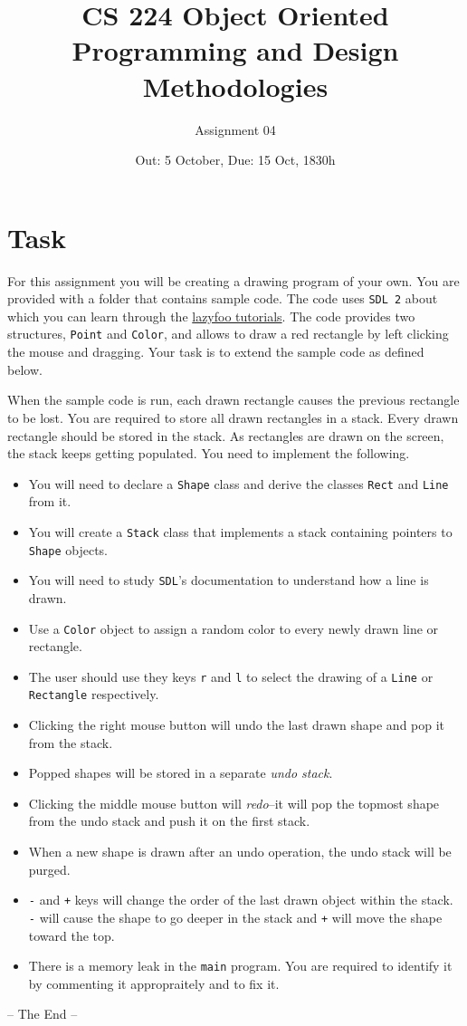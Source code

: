 \documentclass[a4paper,12pt]{article}
\title{CS 224 Object Oriented Programming and Design Methodologies}
\author{Assignment 04}
\date{Out: 5 October, Due: 15 Oct, 1830h}
\begin{document}
\maketitle

\section{Task}

For this assignment you will be creating a drawing program of your own. You are provided with a folder  that contains sample code. The code uses {\tt SDL 2} about which you can learn through the \href{\href{http://lazyfoo.net/tutorials/SDL/}}{lazyfoo tutorials}. The code provides two structures, {\tt Point} and {\tt Color}, and allows to draw a red rectangle by left clicking the mouse and dragging. Your task is to extend the sample code as defined below.

When the sample code is run, each drawn rectangle causes the previous rectangle to be lost. You are required to store all drawn rectangles in a stack. Every drawn rectangle should be stored in the stack. As rectangles are drawn on the screen, the stack keeps getting populated. You need to implement the following.

\begin{itemize}
\item You will need to declare a {\tt Shape} class and derive the classes {\tt Rect} and {\tt Line} from it.
\item You will create a {\tt Stack} class that implements a stack containing pointers to {\tt Shape} objects.
\item You will need to study {\tt SDL}'s documentation to understand how a line is drawn.
\item Use a {\tt Color} object to assign a random color to every newly drawn line or rectangle.
\item The user should use they keys {\tt r} and {\tt l} to select the drawing of a {\tt Line} or {\tt Rectangle} respectively.
\item Clicking the right mouse button will undo the last drawn shape and pop it from the stack.
\item Popped shapes will be stored in a separate {\it undo stack}.
\item Clicking the middle mouse button will {\it redo}--it will pop the topmost shape from the undo stack and push it on the first stack.
\item When a new shape is drawn after an undo operation, the undo stack will be purged.
\item {\tt -} and {\tt +} keys will change the order of the last drawn object within the stack. {\tt -} will cause the shape to go deeper in the stack and {\tt +} will move the shape toward the top.
\item There is a memory leak in the {\tt main} program. You are required to identify it by commenting it appropraitely and to fix it.
\end{itemize}

\begin{center}
  -- The End --
\end{center}
\end{document}
